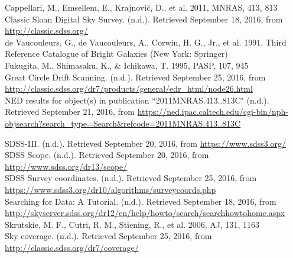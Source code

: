 \documentclass[10pt,letterpaper]{article}
\begin{document}
\newpage
\center
\begin{thebibliography}{1}
 Cappellari, M., Emsellem, E., Krajnovi\'c, D., et al. 2011, MNRAS, 413, 813\\

 Classic Sloan Digital Sky Survey. (n.d.). Retrieved September 18, 2016, from \url{http://classic.sdss.org/}\\

 de Vaucouleurs, G., de Vaucouleurs, A., Corwin, H. G., Jr., et al. 1991, Third
Reference Catalogue of Bright Galaxies (New York: Springer)\\

 Fukugita, M., Shimasaku, K., \& Ichikawa, T. 1995, PASP, 107, 945\\

 Great Circle Drift Scanning. (n.d.). Retrieved September 25, 2016, from \url{http://classic.sdss.org/dr7/products/general/edr_html/node26.html}\\

 NED results for object(s) in publication ``2011MNRAS.413..813C" (n.d.). Retrieved September 21, 2016, from \url{https://ned.ipac.caltech.edu/cgi-bin/nph-objsearch?search_type=Search&refcode=2011MNRAS.413..813C}

 SDSS-III. (n.d.). Retrieved September 20, 2016, from \url{https://www.sdss3.org/}\\

 SDSS Scope. (n.d.). Retrieved September 20, 2016, from \url{http://www.sdss.org/dr13/scope/}\\

 SDSS Survey coordinates. (n.d.). Retrieved September 25, 2016, from \url{https://www.sdss3.org/dr10/algorithms/surveycoords.php}\\

 Searching for Data: A Tutorial. (n.d.). Retrieved September 18, 2016, from \url{http://skyserver.sdss.org/dr12/en/help/howto/search/searchhowtohome.aspx}\\

 Skrutskie, M. F., Cutri, R. M., Stiening, R., et al. 2006, AJ, 131, 1163\\

 Sky coverage. (n.d.). Retrieved September 25, 2016, from \url{http://classic.sdss.org/dr7/coverage/}\\


\end{thebibliography}
\end{document}
